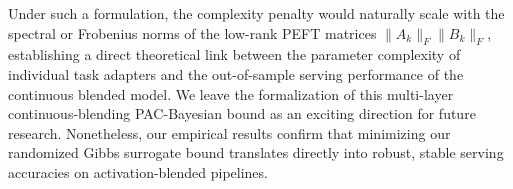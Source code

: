 Under such a formulation, the complexity penalty would naturally scale with the spectral or Frobenius norms of the low-rank PEFT matrices $\|A_k\|_F \|B_k\|_F$, establishing a direct theoretical link between the parameter complexity of individual task adapters and the out-of-sample serving performance of the continuous blended model. We leave the formalization of this multi-layer continuous-blending PAC-Bayesian bound as an exciting direction for future research. Nonetheless, our empirical results confirm that minimizing our randomized Gibbs surrogate bound translates directly into robust, stable serving accuracies on activation-blended pipelines.

